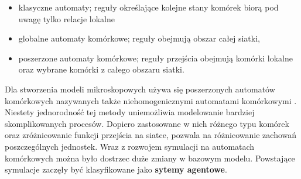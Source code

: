 \begin{itemize}
\item klasyczne automaty; reguły określające kolejne stany komórek biorą pod uwagę tylko relacje lokalne
\item globalne automaty komórkowe; reguły obejmują obszar całej siatki,
\item poszerzone automaty komórkowe; reguły przejścia obejmują komórki lokalne oraz wybrane komórki z całego obszaru siatki.
\end{itemize}

Dla stworzenia modeli mikroskopowych używa się poszerzonych automatów komórkowych nazywanych także niehomogenicznymi automatami komórkowymi \cite{modelowanieDynamikiTlumu}. Niestety jednorodność tej metody uniemożliwia modelowanie bardziej skomplikowanych procesów\cite{FormalizacjaAutomatów}. Dopiero zastosowane w nich różnego typu komórek oraz zróżnicowanie funkcji przejścia na siatce, pozwala na różnicowanie zachowań poszczególnych jednostek. Wraz z rozwojem symulacji na automatach komórkowych można było dostrzec duże zmiany w bazowym modelu. Powstające symulacje zaczęły być klasyfikowane jako \textbf{sytemy agentowe}.




















